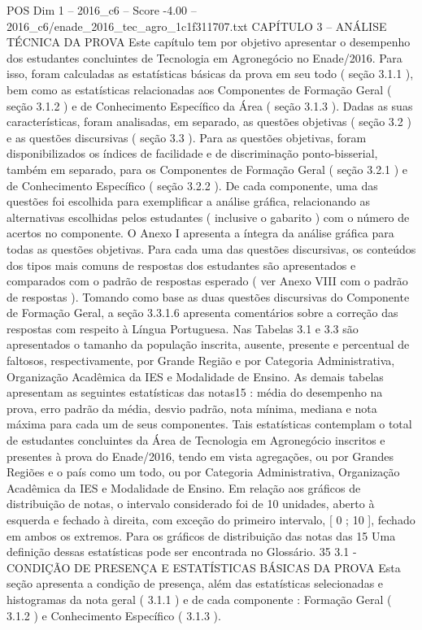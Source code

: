 \begin{textsample}{POS Dim 1 – 2016\_c6 – Score -4.00 – 2016\_c6/enade\_2016\_tec\_agro\_1c1f311707.txt}  \label{ex:f1_pos_394}
CAPÍTULO 3 – ANÁLISE TÉCNICA DA PROVA Este capítulo tem por objetivo apresentar o desempenho dos estudantes concluintes de Tecnologia em Agronegócio no Enade/2016.
Para isso, foram calculadas as estatísticas básicas da prova em seu todo ( seção 3.1.1 ), bem como as estatísticas relacionadas aos Componentes de Formação Geral ( seção 3.1.2 ) e de Conhecimento Específico da Área ( seção 3.1.3 ).
Dadas as suas características, foram analisadas, em separado, as questões objetivas ( seção 3.2 ) e as questões discursivas ( seção 3.3 ).
Para as questões objetivas, foram disponibilizados os índices de facilidade e de discriminação ponto-bisserial, também em separado, para os Componentes de Formação Geral ( seção 3.2.1 ) e de Conhecimento Específico ( seção 3.2.2 ).
De cada componente, uma das questões foi escolhida para exemplificar a análise gráfica, relacionando as alternativas escolhidas pelos estudantes ( inclusive o gabarito ) com o número de acertos no componente.
O Anexo I apresenta a íntegra da análise gráfica para todas as questões objetivas.
Para cada uma das questões discursivas, os conteúdos dos tipos mais comuns de respostas dos estudantes são apresentados e comparados com o padrão de respostas esperado ( ver Anexo VIII com o padrão de respostas ).
Tomando como base as duas questões discursivas do Componente de Formação Geral, a seção 3.3.1.6 apresenta comentários sobre a correção das respostas com respeito à Língua Portuguesa.
Nas Tabelas 3.1 e 3.3 são apresentados o tamanho da população inscrita, ausente, presente e percentual de faltosos, respectivamente, por Grande Região e por Categoria Administrativa, Organização Acadêmica da IES e Modalidade de Ensino.
As demais tabelas apresentam as seguintes estatísticas das notas15 : média do desempenho na prova, erro padrão da média, desvio padrão, nota mínima, mediana e nota máxima para cada um de seus componentes.
Tais estatísticas contemplam o total de estudantes concluintes da Área de Tecnologia em Agronegócio inscritos e presentes à prova do Enade/2016, tendo em vista agregações, ou por Grandes Regiões e o país como um todo, ou por Categoria Administrativa, Organização Acadêmica da IES e Modalidade de Ensino.
Em relação aos gráficos de distribuição de notas, o intervalo considerado foi de 10 unidades, aberto à esquerda e fechado à direita, com exceção do primeiro intervalo, [ 0 ; 10 ], fechado em ambos os extremos.
Para os gráficos de distribuição das notas das 15 Uma definição dessas estatísticas pode ser encontrada no Glossário. 35 3.1 - CONDIÇÃO DE PRESENÇA E ESTATÍSTICAS BÁSICAS DA PROVA Esta seção apresenta a condição de presença, além das estatísticas selecionadas e histogramas da nota geral ( 3.1.1 ) e de cada componente : Formação Geral ( 3.1.2 ) e Conhecimento Específico ( 3.1.3 ).

\end{textsample}
